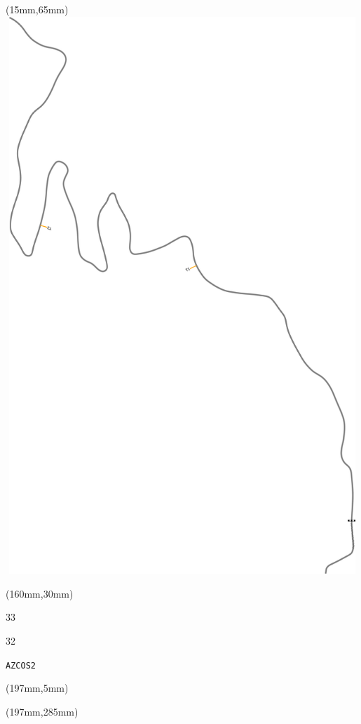 \begin{textblock*}{185mm}(15mm,65mm)%
\centering
\mbox{\includegraphics[width=185mm,height=210mm,keepaspectratio]{PT/AZCOS2.pdf}}
\end{textblock*}
\begin{textblock*}{40mm}(160mm,30mm)%
\Large
\par{} 
\par33 
\par32 
\par\hfill\tiny\tt AZCOS2\\
\end{textblock*}
\begin{textblock*}{20mm}(197mm,5mm)%
\fbox{\thepage}
\label{AZCOS2}
\end{textblock*}
\begin{textblock*}{20mm}(197mm,285mm)%
\fbox{\thepage}
\end{textblock*}

